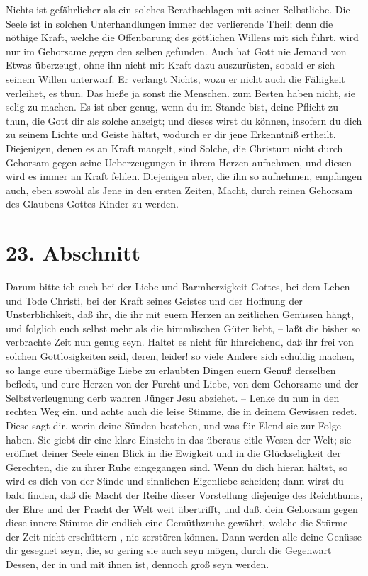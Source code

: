 \medskip

Nichts ist gefährlicher als ein solches Berathschlagen mit seiner Selbstliebe.
Die Seele ist in solchen Unterhandlungen immer der verlierende Theil; denn die
nöthige Kraft, welche die Offenbarung des göttlichen Willens mit sich führt,
wird nur im Gehorsame gegen den selben gefunden. Auch hat Gott nie Jemand von
Etwas überzeugt, ohne ihn nicht mit Kraft dazu auszurüsten, sobald er sich
seinem Willen unterwarf. Er verlangt Nichts, wozu er nicht auch die Fähigkeit
verleihet, es thun. Das hieße ja sonst die Menschen. zum Besten haben nicht, sie
selig zu machen. Es ist aber genug, wenn du im Stande bist, deine Pflicht zu
thun, die Gott dir als solche anzeigt; und dieses wirst du können, insofern du
dich zu seinem Lichte und Geiste hältst, wodurch er dir jene Erkenntniß
ertheilt. Diejenigen, denen es an Kraft mangelt, sind Solche, die Christum nicht
durch Gehorsam gegen seine Ueberzeugungen in ihrem Herzen aufnehmen, und diesen
wird es immer an Kraft fehlen. Diejenigen aber, die ihn so aufnehmen, empfangen
auch, eben sowohl als Jene in den ersten Zeiten, Macht, durch reinen Gehorsam
des Glaubens Gottes Kinder zu werden.

\section{23. Abschnitt} \label{kap4_ab23}

Darum bitte ich euch bei der Liebe und Barmherzigkeit Gottes, bei dem Leben und
Tode Christi, bei der Kraft seines Geistes und der Hoffnung der Unsterblichkeit,
daß ihr, die ihr mit euern Herzen an zeitlichen Genüssen hängt, und folglich
euch selbst mehr als die himmlischen Güter liebt, -- laßt die bisher so
verbrachte Zeit nun genug seyn. Haltet es nicht für hinreichend, daß ihr frei
von solchen Gottlosigkeiten seid, deren, leider! so viele Andere sich schuldig
machen, so lange eure übermäßige Liebe zu erlaubten Dingen euern Genuß derselben
befledt, und eure Herzen von der Furcht und Liebe, von dem Gehorsame und der
Selbstverleugnung derb wahren Jünger Jesu abziehet. -- Lenke du nun in den
rechten Weg ein, und achte auch die leise Stimme, die in deinem Gewissen redet.
Diese sagt dir, worin deine Sünden bestehen, und was für Elend sie zur Folge
haben. Sie giebt dir eine klare Einsicht in das überaus eitle Wesen der Welt;
sie eröffnet deiner Seele einen Blick in die Ewigkeit und in die Glückseligkeit
der Gerechten, die zu ihrer Ruhe eingegangen sind. Wenn du dich hieran hältst,
so wird es dich von der Sünde und sinnlichen Eigenliebe scheiden; dann wirst du
bald finden, daß die Macht der Reihe dieser Vorstellung diejenige des
Reichthums, der Ehre und der Pracht der Welt weit übertrifft, und daß. dein
Gehorsam gegen diese innere Stimme dir endlich eine Gemüthzruhe gewährt, welche
die Stürme der Zeit nicht erschüttern , nie zerstören können. Dann werden alle
deine Genüsse dir gesegnet seyn, die, so gering sie auch seyn mögen, durch die
Gegenwart Dessen, der in und mit ihnen ist, dennoch groß seyn werden.

